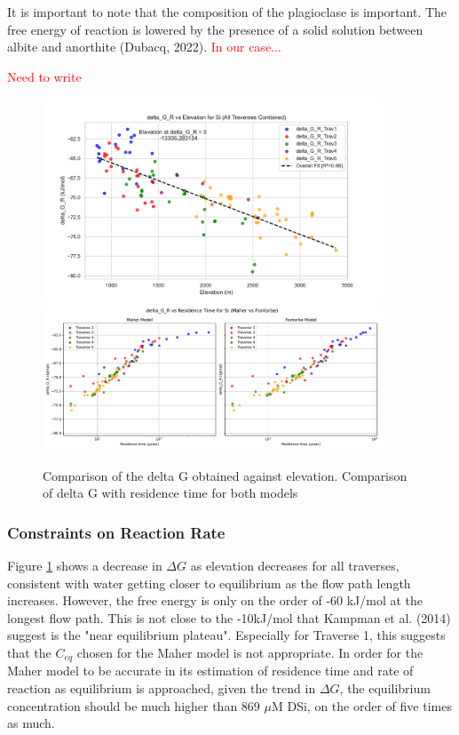 It is important to note that the composition of the plagioclase is important. The free energy of reaction is lowered by the presence of a solid solution between albite and anorthite (Dubacq, 2022). \textcolor{red}{In our case...}

\newpage

\textcolor{red}{Need to write }
\begin{figure}[H]
    \centering
    \includegraphics[width=0.9\textwidth]{delta_G_R_Si_combined_fit.pdf}
    \includegraphics[width=0.9\textwidth]{delta_G_R_Si_time_Maher_vs_Fontorbe.pdf}
    \caption{Comparison of the delta G obtained against elevation. Comparison of delta G with residence time for both models}
    \label{fig:discussion8}
\end{figure}

\FloatBarrier


\newpage

\subsubsection*{Constraints on Reaction Rate}

Figure \ref{fig:discussion8} shows a decrease in $\Delta G$ as elevation decreases for all traverses, consistent with water getting closer to equilibrium as the flow path length increases. However, the free energy is only on the order of -60 kJ/mol at the longest flow path. This is not close to the -10kJ/mol that Kampman et al. (2014) suggest is the "near equilibrium plateau". Especially for Traverse 1, this suggests that the $C_{eq}$ chosen for the Maher model is not appropriate. In order for the Maher model to be accurate in its estimation of residence time and rate of reaction as equilibrium is approached, given the trend in $\Delta G$, the equilibrium concentration should be much higher than 869 $\mu$M DSi, on the order of five times as much.

